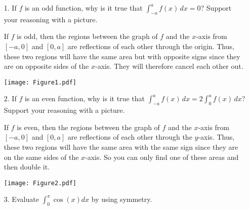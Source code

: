 \documentclass[nooutcomes, handout]{ximera}
\renewcommand{\d}{\,d}
\begin{document}
\begin{problem}
  \mbox{}
  \begin{enumerate}
		
  \item[1.]  If $f$ is an odd function, why is it true that
    $\int_{-a}^a f(x) \d x = 0$?  Support your reasoning with a
    picture.
    \begin{freeResponse}
      If $f$ is odd, then the regions between the graph of $f$ and the
      $x$-axis from $[-a,0]$ and $[0,a]$ are reflections of each other
      through the origin.  Thus, these two regions will have the same
      area but with opposite signs since they are on opposite sides of
      the $x$-axis.  They will therefore cancel each other out.
		
      \begin{image}
        \texttt{[image: Figure1.pdf]}
      \end{image}

    \end{freeResponse}
		
		
		
  \item[2.]  If $f$ is an even function, why is it true that
    $\int_{-a}^a f(x) \d x = 2 \int_0^a f(x) \d x$?  Support your
    reasoning with a picture.
    \begin{freeResponse}
      If $f$ is even, then the regions between the graph of $f$ and
      the $x$-axis from $[-a,0]$ and $[0,a]$ are reflections of each
      other through the $y$-axis.  Thus, these two regions will have
      the same area with the same sign since they are on the same
      sides of the $x$-axis.  So you can only find one of these areas
      and then double it.
		
      \begin{image}
        \texttt{[image: Figure2.pdf]}
      \end{image}
			
    \end{freeResponse}
		
		
	
  \item[3.]
    Evaluate $\int_0^{\pi} \cos(x) dx$ by using symmetry.
  \end{enumerate}
\end{problem}
\end{document}
